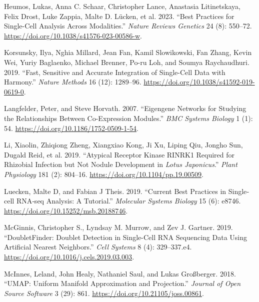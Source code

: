 \documentclass[
  letterpaper,
  DIV=11,
  numbers=noendperiod]{scrartcl}
\newlength{\cslhangindent}
\newlength{\cslentryspacingunit} %
\newenvironment{CSLReferences}[2] %
 {%
  \setlength{\parindent}{0pt}
  \ifodd #1
  \let\oldpar\par
  \def\par{\hangindent=\cslhangindent\oldpar}
  \fi
  \setlength{\parskip}{#2\cslentryspacingunit}
 }%
 {}
\begin{document}
\begin{CSLReferences}{1}{0}
\leavevmode{}%
Heumos, Lukas, Anna C. Schaar, Christopher Lance, Anastasia
Litinetskaya, Felix Drost, Luke Zappia, Malte D. Lücken, et al. 2023.
{``Best Practices for Single-Cell Analysis Across Modalities.''}
\emph{Nature Reviews Genetics} 24 (8): 550--72.
\url{https://doi.org/10.1038/s41576-023-00586-w}.

\leavevmode{}%
Korsunsky, Ilya, Nghia Millard, Jean Fan, Kamil Slowikowski, Fan Zhang,
Kevin Wei, Yuriy Baglaenko, Michael Brenner, Po-ru Loh, and Soumya
Raychaudhuri. 2019. {``Fast, Sensitive and Accurate Integration of
Single-Cell Data with {Harmony}.''} \emph{Nature Methods} 16 (12):
1289--96. \url{https://doi.org/10.1038/s41592-019-0619-0}.

\leavevmode{}%
Langfelder, Peter, and Steve Horvath. 2007. {``Eigengene Networks for
Studying the Relationships Between Co-Expression Modules.''} \emph{BMC
Systems Biology} 1 (1): 54.
\url{https://doi.org/10.1186/1752-0509-1-54}.

\leavevmode{}%
Li, Xiaolin, Zhiqiong Zheng, Xiangxiao Kong, Ji Xu, Liping Qiu, Jongho
Sun, Dugald Reid, et al. 2019. {``Atypical Receptor Kinase {RINRK}1
Required for Rhizobial Infection but Not Nodule Development in
\emph{Lotus Japonicus}.''} \emph{Plant Physiology} 181 (2): 804--16.
\url{https://doi.org/10.1104/pp.19.00509}.

\leavevmode{}%
Luecken, Malte D, and Fabian J Theis. 2019. {``Current Best Practices in
Single‐cell {RNA}‐seq Analysis: A Tutorial.''} \emph{Molecular Systems
Biology} 15 (6): e8746. \url{https://doi.org/10.15252/msb.20188746}.

\leavevmode{}%
McGinnis, Christopher S., Lyndsay M. Murrow, and Zev J. Gartner. 2019.
{``{DoubletFinder}: {Doublet} {Detection} in {Single}-{Cell} {RNA}
{Sequencing} {Data} {Using} {Artificial} {Nearest} {Neighbors}.''}
\emph{Cell Systems} 8 (4): 329--337.e4.
\url{https://doi.org/10.1016/j.cels.2019.03.003}.

\leavevmode{}%
McInnes, Leland, John Healy, Nathaniel Saul, and Lukas Großberger. 2018.
{``{UMAP}: {Uniform} {Manifold} {Approximation} and {Projection}.''}
\emph{Journal of Open Source Software} 3 (29): 861.
\url{https://doi.org/10.21105/joss.00861}.


\end{CSLReferences}
\end{document}
